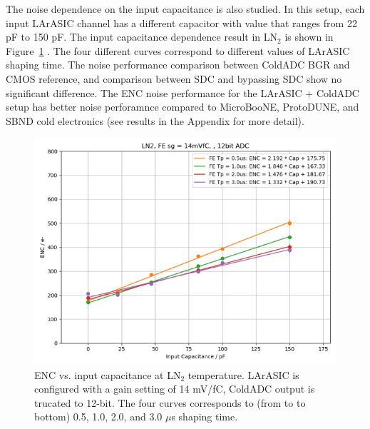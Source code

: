 The noise dependence on the input capacitance is also studied. In this setup, each input LArASIC channel has
a different capacitor with value that ranges from 22 pF to 150 pF. The input capacitance dependence result in 
LN$_2$ is shown in Figure~\ref{fig:noise_capacitance} . The four different curves correspond 
to different values of LArASIC shaping time. 
The noise performance comparison between ColdADC BGR and CMOS reference, and comparison between 
SDC and bypassing SDC show no significant difference.
The ENC noise performance for the LArASIC + ColdADC setup has better noise perforamnce compared to 
MicroBooNE, ProtoDUNE, and SBND cold electronics (see results in the Appendix for more detail).
\begin{figure}[h!]
\centering
  \includegraphics[width=0.8\linewidth]{figures/noise_capacitance.png}
  \caption{ENC vs. input capacitance at LN$_2$ temperature. LArASIC is configured with a gain setting of
14 mV/fC, ColdADC output is trucated to 12-bit. The four curves corresponds to (from to to bottom) 0.5, 
1.0, 2.0, and 3.0 $\mu$s shaping time.} 
  \label{fig:noise_capacitance}
\end{figure}

